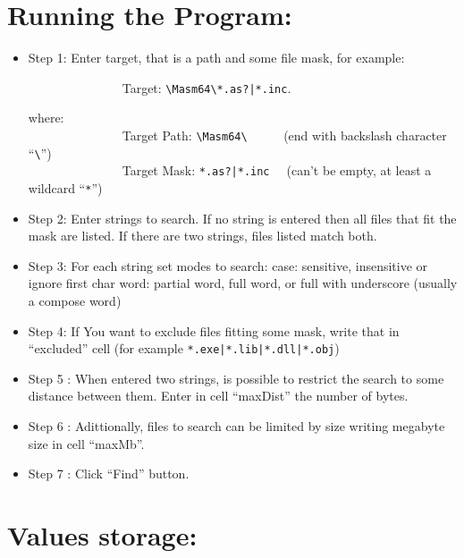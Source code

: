 \documentclass[11pt,a4paper]{scrartcl}
\begin{document}
\title{\color{myblue}{LookingFor }}
\subtitle{\color{myblue}{A Masm64 tool to find strings in files}}

\author{Héctor S. Enrique}
\date{ may 15, 2024}
\maketitle

\section{Running the Program: }

    \begin{itemize}
        \item Step 1: Enter target, that is a path and some file mask, for example:
         
        \verb$              $ Target: \verb$\Masm64\*.as?|*.inc$. 
        
	\hspace{1cm} where:\\
        \verb$              $ Target Path: \verb$\Masm64\     $  (end with backslash character ``\verb$\$'') \\
        \verb$              $ Target Mask: \verb$*.as?|*.inc  $  (can't be empty, at least a wildcard ``\verb$*$'') 
        
        \item Step 2: Enter strings to search. If no string is entered then all files that fit the mask are listed. If there are two strings, files listed match both.
        \item Step 3: For each string set modes to search:
	 \subitem case: sensitive, insensitive or ignore first char
	 \subitem word: partial word, full word, or full with underscore (usually a compose word) 
        \item Step 4:  If You want to exclude files fitting some mask, write that in ``excluded'' cell (for example \verb$*.exe|*.lib|*.dll|*.obj$)
        \item Step 5 : When entered two strings, is possible to restrict the search to some distance between them. Enter in cell ``maxDist'' the number of bytes.
        \item Step 6 : Adittionally, files to search can be limited by size writing megabyte size in cell ``maxMb''.
        \item Step 7 : Click ``Find'' button.
     \end{itemize}

\section{Values storage: }
\end{document}
